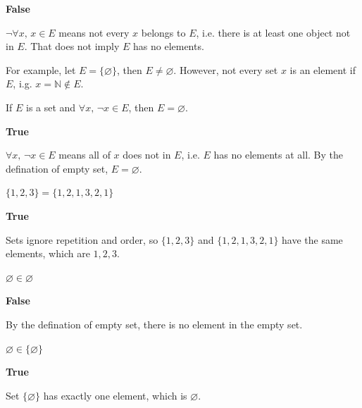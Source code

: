 \begin{mysolution}
    \textbf{False}

    $\neg \forall x,\, x \in E$ means not every $x$ belongs to $E$, i.e. there is at least one object not in $E$. That does not imply $E$ has no elements. 
    
    For example, let $E=\{\varnothing\}$, then $E \ne \varnothing$. However, not every set $x$ is an element if $E$, i.g. $x=\mathbb{N} \notin E$.
\end{mysolution}

\begin{chapex}
If $E$ is a set and $\forall x,\, \neg x \in E$, then $E = \varnothing$.
\end{chapex}

\begin{mysolution}
    \textbf{True}

    $\forall x,\, \neg x \in E$ means all of $x$ does not in $E$, i.e. $E$ has no elements at all. By the defination of empty set, $E=\varnothing$.
\end{mysolution}

\begin{chapex}
$\{ 1, 2, 3 \} = \{ 1, 2, 1, 3, 2, 1 \}$
\end{chapex}

\begin{mysolution}
    \textbf{True}

    Sets ignore repetition and order, so $\{ 1, 2, 3 \}$ and $\{ 1, 2, 1, 3, 2, 1 \}$ have the same elements, which are $1, 2, 3$.
\end{mysolution}

\begin{chapex}
$\varnothing \in \varnothing$
\end{chapex}

\begin{mysolution}
    \textbf{False}

    By the defination of empty set, there is no element in the empty set.
\end{mysolution}

\begin{chapex}
$\varnothing \in \{ \varnothing \}$
\end{chapex}

\begin{mysolution}
    \textbf{True}

    Set $\{ \varnothing \}$ has exactly one element, which is $\varnothing$.
\end{mysolution}

